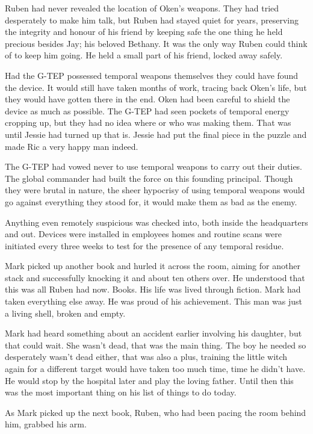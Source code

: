 Ruben had never revealed the location of Oken's weapons.  They had tried desperately to make him talk, but Ruben had stayed quiet for years, preserving the integrity and honour of his friend by keeping safe the one thing he held precious besides Jay; his beloved Bethany.   It was the only way Ruben could think of to keep him going.  He held  a small part of his friend, locked away safely.

Had the G-TEP possessed temporal weapons themselves they could have found the device.  It would still have taken months of work, tracing back Oken's life, but they would have gotten there in the end.  Oken had been careful to shield the device as much as possible.  The G-TEP had seen pockets of temporal energy cropping up, but they had no idea where or who was making them.  That was until Jessie had turned up that is.  Jessie had put the final piece in the puzzle and made Ric a very happy man indeed.

The G-TEP had vowed never to use temporal weapons to carry out their duties.  The global commander had built the force on this founding principal.  Though they were brutal in nature, the sheer hypocrisy of using temporal weapons would go against everything they stood for, it would make them as bad as the enemy.  

Anything even remotely suspicious was checked into, both inside the headquarters and out.  Devices were installed in employees homes and routine scans were initiated every three weeks to test for the presence of any temporal residue.

Mark picked up another book and hurled it across the room, aiming for another stack and successfully knocking it and about ten others over.  He understood that this was all Ruben had now.  Books.  His life was lived through fiction.  Mark had taken everything else away.  He was proud of his achievement.  This man was just a living shell, broken and empty.

Mark had heard something about an accident earlier involving his daughter, but that could wait.  She wasn't dead, that was the main thing.  The boy he needed so desperately wasn't dead either, that was also a plus, training the little witch again for a different target would have taken too much time, time he didn't have.  He would stop by the hospital later and play the loving father.  Until then this was the most important thing on his list of things to do today.

As Mark picked up the next book, Ruben, who had been pacing the room behind him, grabbed his arm.

